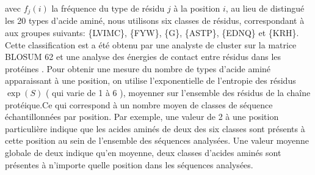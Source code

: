 avec $f_j(i)$ la fréquence du type de résidu $j$ à la position $i$, au lieu de distingué les 20 types d'acide aminé, nous utilisons six classes de résidus, correspondant à  aux groupes suivants: \{LVIMC\}, \{FYW\}, \{G\}, \{ASTP\}, \{EDNQ\} et \{KRH\}. Cette classification est a été obtenu par une analyste de cluster  sur la matrice BLOSUM 62 \label{eq:entropy} et une analyse  des énergies de contact entre résidus dans les protéines \cite{Launay07} . Pour obtenir une mesure du nombre de types d'acide aminé apparaissant à une position, on utilise l'exponentielle de l'entropie des résidus $\exp(S)$ ( qui varie de 1 à 6 ), moyenner sur l'ensemble des résidus de la chaîne protéique.Ce qui correspond à un nombre moyen de classes de séquence échantillonnées par position. Par exemple, une valeur de 2 à une position particulière indique que les acides aminés de deux des six classes sont présents à cette position au sein de l'ensemble des séquences analysées. Une valeur moyenne globale de deux indique qu'en moyenne, deux classes d'acides aminés sont présentes à n'importe quelle position dans les séquences analysées.



\clearpage


